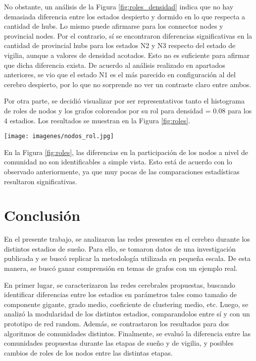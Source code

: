 \documentclass[a4paper,10pt,twocolumn,spanish]{article}
\begin{document}
No obstante, un análisis de la Figura \ref{fig:roles_densidad} indica que no hay demasiada diferencia entre los estados despierto y dormido en lo que respecta a cantidad de hubs. Lo mismo puede afirmarse para los connector nodes y provincial nodes. Por el contrario, sí se encontraron diferencias significativas en la cantidad de provincial hubs para los estados N2 y N3 respecto del estado de vigilia, aunque a valores de densidad acotados. Esto no es suficiente para afirmar que dicha diferencia exista. De acuerdo al análisis realizado en apartados anteriores, se vio que el estado N1 es el más parecido en configuración al del cerebro despierto, por lo que no sorprende no ver un contraste claro entre ambos. 

Por otra parte, se decidió visualizar por ser representativos tanto el histograma de roles de nodos y los grafos coloreados por su rol para densidad = 0.08 para los 4 estadios. Los resultados se muestran en la Figura \ref{fig:roles}.

\begin{figure*}[htb]
\centering
\texttt{[image: imagenes/nodos\_rol.jpg]}
\caption{Nodos coloreados de acuerdo a su rol - Coordenadas cerebrales}
\label{fig:roles}
\end{figure*}

En la Figura \ref{fig:roles}, las diferencias en la participación de los nodos a nivel de comunidad no son identificables a simple vista. Esto está de acuerdo con lo observado anteriormente, ya que muy pocas de las comparaciones estadísticas resultaron significativas.

\section{Conclusión}
En el presente trabajo, se analizaron las redes presentes en el cerebro durante los distintos estadios de sueño. Para ello, se tomaron datos de una investigación publicada y se buscó replicar la metodología utilizada en pequeña escala. De esta manera, se buscó ganar comprensión en temas de grafos con un ejemplo real. 

En primer lugar, se caracterizaron las redes cerebrales propuestas, buscando identificar diferencias entre los estadios en parámetros tales como tamaño de componente gigante, grado medio, coeficiente de clustering medio, etc. Luego, se analizó la modularidad de los distintos estadios, comparandolos entre sí y con un prototipo de red random. Además, se contrastaron los resultados para dos algoritmos de comunidades distintos. Finalmente, se evaluó la diferencia entre las comunidades propuestas durante las etapas de sueño y de vigilia, y posibles cambios de roles de los nodos entre las distintas etapas. 
\end{document}
